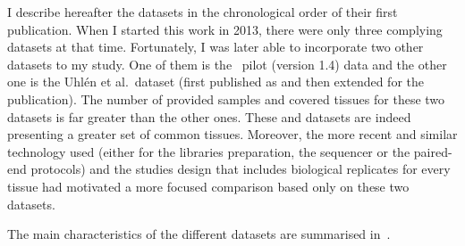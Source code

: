 I describe hereafter the datasets in the chronological order of their first
publication.
When I started this work in 2013, there were only three complying
datasets at that time. Fortunately, I was later
able to incorporate two other datasets to my study. One of them is the \Gtex\
pilot (version 1.4) data and the other one is the Uhlén et al.\ dataset (first
published as \citet{Uhlen2014} and then extended for the \citet{Uhlen2015} publication).
The number of provided samples and covered tissues for these two datasets
is far greater than the other ones. These \dataset{\Gtex} and 
datasets are indeed presenting a greater set of common tissues. Moreover,
the more recent and similar technology used (either for the libraries preparation,
the sequencer or the paired-end protocols) and the studies design that includes
biological replicates for every tissue had motivated a more focused comparison
based only on these two datasets.

The main characteristics of the different datasets are summarised
in~\Cref{tab:Trans5DF}.

